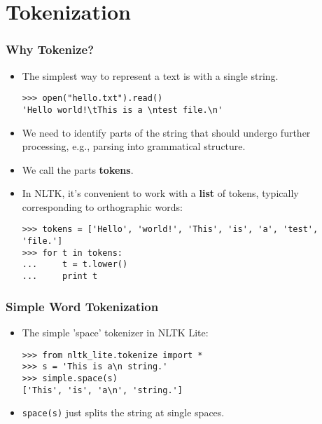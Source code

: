 \section{Tokenization}


 
\begin{frame}[fragile]
  \frametitle{Why Tokenize?}

  \begin{itemize}[<+->]
  \item<1->  The simplest way to represent a text is with a single string.
\begin{verbatim}
>>> open("hello.txt").read()   
'Hello world!\tThis is a \ntest file.\n'  
\end{verbatim}
  \item<2-> We need to identify parts of the string that should
    undergo further processing, e.g., parsing into grammatical structure.
  \item<3-> We call the parts \textbf{tokens}.
  \item<4-> In NLTK, it's convenient to work with a \textbf{list} of
    tokens, typically corresponding to orthographic words: 
{\small
\begin{verbatim}
>>> tokens = ['Hello', 'world!', 'This', 'is', 'a', 'test', 'file.'] 
>>> for t in tokens:
...     t = t.lower()
...     print t   
\end{verbatim}
}
  \end{itemize}
\end{frame}

\begin{frame}[fragile]
  \frametitle{Simple Word Tokenization}

  \begin{itemize}[<+->]
  \item The simple 'space' tokenizer in NLTK Lite:
\begin{verbatim}
>>> from nltk_lite.tokenize import *
>>> s = 'This is a\n string.' 
>>> simple.space(s)
['This', 'is', 'a\n', 'string.']  
\end{verbatim}
  \item \verb!space(s)! just splits the string at single spaces.
  \end{itemize}
\end{frame}



